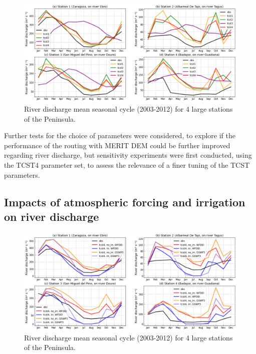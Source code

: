 \begin{figure}[htbp]
    \centering
    \includegraphics[width=\linewidth]{images/chap3/river_discharge/merit_tcst_4stations_SC.png}
    \caption{River discharge mean seasonal cycle (2003-2012) for 4 large stations of the Peninsula.}
    \label{fig:merit_tcsts_stations_SC}
\end{figure}

Further tests for the choice of parameters were considered, to explore if the performance of the \native routing with MERIT DEM could be further improved regarding river discharge, but sensitivity experiments were first conducted, using the TCST4 parameter set, to assess the relevance of a finer tuning of the TCST parameters.

\subsection{Impacts of atmospheric forcing and irrigation on river discharge}

\begin{figure}[htbp]
    \centering
    \includegraphics[width=\linewidth]{images/chap3/river_discharge/merit_forcing_4stations_SC.png}
    \caption{River discharge mean seasonal cycle (2003-2012) for 4 large stations of the Peninsula.}
    \label{fig:merit_forcing_stations_SC}
\end{figure}

